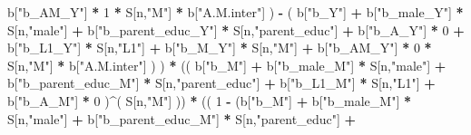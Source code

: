 \documentclass[
]{book}
\newenvironment{Shaded}{\begin{snugshade}}{\end{snugshade}}
\newcommand{\DecValTok}[1]{\textcolor[rgb]{0.00,0.00,0.81}{#1}}
\newcommand{\NormalTok}[1]{#1}
\newcommand{\SpecialCharTok}[1]{\textcolor[rgb]{0.81,0.36,0.00}{\textbf{#1}}}
\newcommand{\StringTok}[1]{\textcolor[rgb]{0.31,0.60,0.02}{#1}}
\begin{document}
\begin{Shaded}
\begin{Highlighting}[]
\NormalTok{                             b[}\StringTok{"b\_AM\_Y"}\NormalTok{] }\SpecialCharTok{*} \DecValTok{1} \SpecialCharTok{*}\NormalTok{ S[n,}\StringTok{"M"}\NormalTok{] }\SpecialCharTok{*}\NormalTok{ b[}\StringTok{"A.M.inter"}\NormalTok{] ) }\SpecialCharTok{{-}} 
\NormalTok{                           ( b[}\StringTok{"b\_Y"}\NormalTok{] }\SpecialCharTok{+} 
\NormalTok{                               b[}\StringTok{"b\_male\_Y"}\NormalTok{] }\SpecialCharTok{*}\NormalTok{ S[n,}\StringTok{"male"}\NormalTok{] }\SpecialCharTok{+} 
\NormalTok{                               b[}\StringTok{"b\_parent\_educ\_Y"}\NormalTok{] }\SpecialCharTok{*}\NormalTok{ S[n,}\StringTok{"parent\_educ"}\NormalTok{] }\SpecialCharTok{+} 
\NormalTok{                               b[}\StringTok{"b\_A\_Y"}\NormalTok{] }\SpecialCharTok{*} \DecValTok{0} \SpecialCharTok{+} 
\NormalTok{                               b[}\StringTok{"b\_L1\_Y"}\NormalTok{] }\SpecialCharTok{*}\NormalTok{ S[n,}\StringTok{"L1"}\NormalTok{] }\SpecialCharTok{+}
\NormalTok{                               b[}\StringTok{"b\_M\_Y"}\NormalTok{] }\SpecialCharTok{*}\NormalTok{ S[n,}\StringTok{"M"}\NormalTok{] }\SpecialCharTok{+} 
\NormalTok{                               b[}\StringTok{"b\_AM\_Y"}\NormalTok{] }\SpecialCharTok{*} \DecValTok{0} \SpecialCharTok{*}\NormalTok{ S[n,}\StringTok{"M"}\NormalTok{] }\SpecialCharTok{*}\NormalTok{ b[}\StringTok{"A.M.inter"}\NormalTok{] ) ) }\SpecialCharTok{*}
\NormalTok{      (( b[}\StringTok{"b\_M"}\NormalTok{] }\SpecialCharTok{+} 
\NormalTok{           b[}\StringTok{"b\_male\_M"}\NormalTok{] }\SpecialCharTok{*}\NormalTok{ S[n,}\StringTok{"male"}\NormalTok{] }\SpecialCharTok{+} 
\NormalTok{           b[}\StringTok{"b\_parent\_educ\_M"}\NormalTok{] }\SpecialCharTok{*}\NormalTok{ S[n,}\StringTok{"parent\_educ"}\NormalTok{] }\SpecialCharTok{+} 
\NormalTok{           b[}\StringTok{"b\_L1\_M"}\NormalTok{] }\SpecialCharTok{*}\NormalTok{ S[n,}\StringTok{"L1"}\NormalTok{] }\SpecialCharTok{+}
\NormalTok{           b[}\StringTok{"b\_A\_M"}\NormalTok{] }\SpecialCharTok{*} \DecValTok{0}\NormalTok{ )}\SpecialCharTok{\^{}}\NormalTok{( S[n,}\StringTok{"M"}\NormalTok{] )) }\SpecialCharTok{*} 
\NormalTok{      (( }\DecValTok{1} \SpecialCharTok{{-}}\NormalTok{ (b[}\StringTok{"b\_M"}\NormalTok{] }\SpecialCharTok{+} 
\NormalTok{                b[}\StringTok{"b\_male\_M"}\NormalTok{] }\SpecialCharTok{*}\NormalTok{ S[n,}\StringTok{"male"}\NormalTok{] }\SpecialCharTok{+} 
\NormalTok{                b[}\StringTok{"b\_parent\_educ\_M"}\NormalTok{] }\SpecialCharTok{*}\NormalTok{ S[n,}\StringTok{"parent\_educ"}\NormalTok{] }\SpecialCharTok{+} 

\end{Highlighting}
\end{Shaded}
\end{document}
